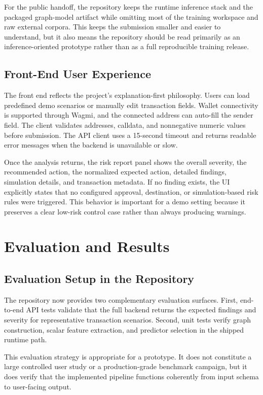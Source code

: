 \documentclass[11pt]{article}
\begin{document}
For the public handoff, the repository keeps the runtime inference stack and the packaged graph-model artifact while omitting most of the training workspace and raw external corpora. This keeps the submission smaller and easier to understand, but it also means the repository should be read primarily as an inference-oriented prototype rather than as a full reproducible training release.

\subsection{Front-End User Experience}

The front end reflects the project's explanation-first philosophy. Users can load predefined demo scenarios or manually edit transaction fields. Wallet connectivity is supported through Wagmi, and the connected address can auto-fill the sender field. The client validates addresses, calldata, and nonnegative numeric values before submission. The API client uses a 15-second timeout and returns readable error messages when the backend is unavailable or slow.

Once the analysis returns, the risk report panel shows the overall severity, the recommended action, the normalized expected action, detailed findings, simulation details, and transaction metadata. If no finding exists, the UI explicitly states that no configured approval, destination, or simulation-based risk rules were triggered. This behavior is important for a demo setting because it preserves a clear low-risk control case rather than always producing warnings.

\section{Evaluation and Results}

\subsection{Evaluation Setup in the Repository}

The repository now provides two complementary evaluation surfaces. First, end-to-end API tests validate that the full backend returns the expected findings and severity for representative transaction scenarios. Second, unit tests verify graph construction, scalar feature extraction, and predictor selection in the shipped runtime path.

This evaluation strategy is appropriate for a prototype. It does not constitute a large controlled user study or a production-grade benchmark campaign, but it does verify that the implemented pipeline functions coherently from input schema to user-facing output.
\end{document}
